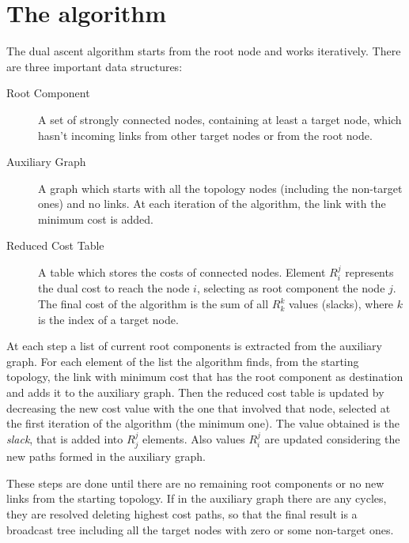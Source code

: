 \section{The algorithm}\label{sec:algorithm}

The dual ascent algorithm starts from the root node and works
iteratively. There are three important data structures:

\begin{description}
	\item[Root Component] A set of strongly connected nodes, containing at
		least a target node, which hasn't incoming links from other
		target nodes or from the root node.
	\item[Auxiliary Graph] A graph which starts with all the topology nodes
		(including the non-target ones) and no links. At each iteration
		of the algorithm, the link with the minimum cost is added.
	\item[Reduced Cost Table] A table which stores the costs of connected
		nodes. Element \(R_i^j\) represents the dual cost to reach the
		node \(i\), selecting as root component the node \(j\). The
		final cost of the algorithm is the sum of all \(R_k^k\) values
		(slacks), where \(k\) is the index of a target node.
\end{description}

At each step a list of current root components is extracted from the auxiliary
graph. For each element of the list the algorithm finds, from the starting
topology, the link with minimum cost that has the root component as destination
and adds it to the auxiliary graph. Then the reduced cost table is updated by
decreasing the new cost value with the one that involved that node, selected at
the first iteration of the algorithm (the minimum one). The value obtained is
the \emph{slack}, that is added into \(R_j^j\) elements. Also values \(R_i^j\)
are updated considering the new paths formed in the auxiliary graph.

These steps are done until there are no remaining root components or no new
links from the starting topology. If in the auxiliary graph there are any
cycles, they are resolved deleting highest cost paths, so that the final result
is a broadcast tree including all the target nodes with zero or some non-target
ones.
